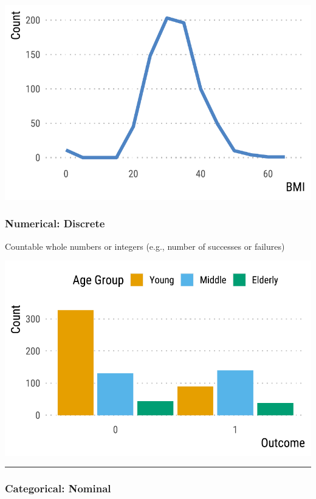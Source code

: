 \documentclass[
  letterpaper,
  DIV=11,
  numbers=noendperiod]{scrreprt}
\begin{document}
\includegraphics{./intro_files/figure-pdf/unnamed-chunk-4-1.pdf}

\hypertarget{numerical-discrete}{%
\subsubsection{\texorpdfstring{\textbf{Numerical}:
Discrete}{Numerical: Discrete}}\label{numerical-discrete}}

Countable whole numbers or integers (e.g., number of successes or
failures)

\includegraphics{./intro_files/figure-pdf/unnamed-chunk-5-1.pdf}

\begin{center}\rule{0.5\linewidth}{0.5pt}\end{center}

\hypertarget{categorical-nominal}{%
\subsubsection{\texorpdfstring{\textbf{Categorical}:
Nominal}{Categorical: Nominal}}\label{categorical-nominal}}
\end{document}

